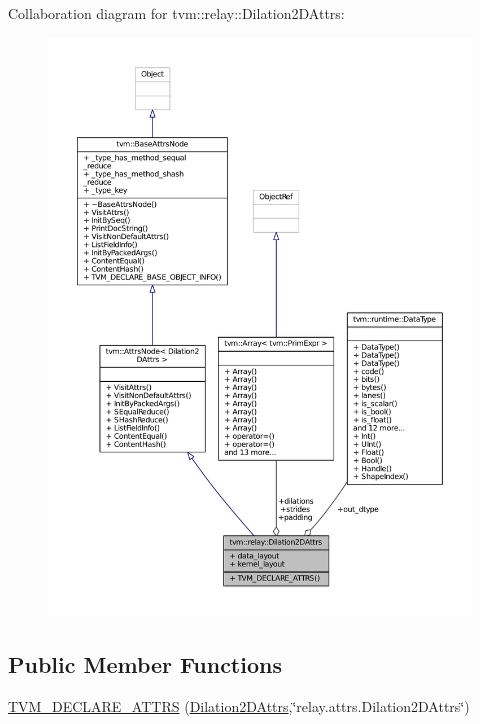 Collaboration diagram for tvm\+:\+:relay\+:\+:Dilation2\+D\+Attrs\+:
\nopagebreak
\begin{figure}[H]
\begin{center}
\leavevmode
\includegraphics[width=350pt]{structtvm_1_1relay_1_1Dilation2DAttrs__coll__graph}
\end{center}
\end{figure}
\subsection*{Public Member Functions}
\begin{DoxyCompactItemize}
\item 
\hyperlink{structtvm_1_1relay_1_1Dilation2DAttrs_a39f05a28838666487c3e0edd077b49f0}{T\+V\+M\+\_\+\+D\+E\+C\+L\+A\+R\+E\+\_\+\+A\+T\+T\+RS} (\hyperlink{structtvm_1_1relay_1_1Dilation2DAttrs}{Dilation2\+D\+Attrs},\char`\"{}relay.\+attrs.\+Dilation2\+D\+Attrs\char`\"{})
\end{DoxyCompactItemize}
